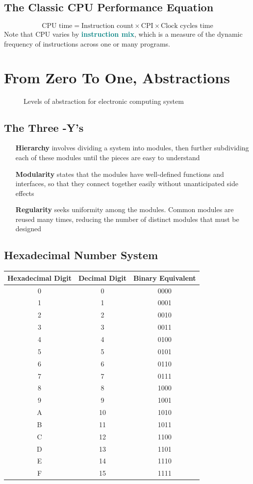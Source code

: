 \documentclass[12pt]{article}
\theoremstyle{definition}
\newcommand{\defnterm}[1]{\textbf{\textcolor{teal}{#1}}\index{#1}}
\newcommand{\includePicture}[3]{
  \begin{figure}[!ht]
  \centering
  \scalebox{#1}{\texttt{[image: \#2]}}
  \caption{#3}
  \end{figure}
}
\begin{document}
  \subsection{The Classic CPU Performance Equation}
  $$\text{CPU time} = \text{Instruction count} \times \text{CPI} \times \text{Clock cycles time}$$
  Note that CPU varies by \defnterm{instruction mix}, which is a measure of the dynamic frequency of instructions across one or many programs.

  \newpage

  \section{From Zero To One, Abstractions}
  \includePicture{0.6}{pictures/abstractionLevel.png}{Levels of abstraction for electronic computing system}
  \subsection{The Three -Y's}
  \begin{itemize}
    \item [\textbf{Hierarchy}] involves dividing a system into modules, then further subdividing each of these modules until the pieces are easy to understand
    \item [\textbf{Modularity}] states that the modules have well-defined functions and interfaces, so that they connect together easily without unanticipated side effects
    \item [\textbf{Regularity}] seeks uniformity among the modules. Common modules are reused many times, reducing the number of distinct modules that must be designed
  \end{itemize}

  \subsection{Hexadecimal Number System}
  \begin{tabular} {| c | c | c |}
  \hline
  Hexadecimal Digit & Decimal Digit & Binary Equivalent \\ \hline \hline
  0 & 0 & 0000 \\ \hline
  1 & 1 & 0001 \\ \hline
  2 & 2 & 0010 \\ \hline
  3 & 3 & 0011 \\ \hline
  4 & 4 & 0100 \\ \hline
  5 & 5 & 0101 \\ \hline
  6 & 6 & 0110 \\ \hline
  7 & 7 & 0111 \\ \hline
  8 & 8 & 1000 \\ \hline
  9 & 9 & 1001 \\ \hline
  A & 10 & 1010 \\ \hline
  B & 11 & 1011 \\ \hline
  C & 12 & 1100 \\ \hline
  D & 13 & 1101 \\ \hline
  E & 14 & 1110 \\ \hline
  F & 15 & 1111 \\ \hline
  \end{tabular}
\end{document}
